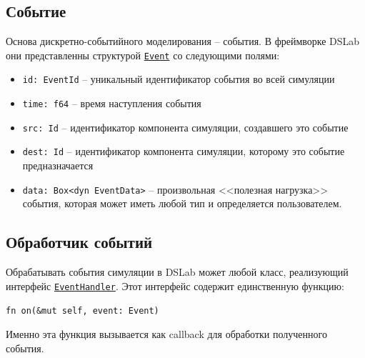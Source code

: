 \subsection{Событие} \label{Event}
Основа дискретно-событийного моделирования -- события. В фреймворке DSLab они представленны структурой \underline{\texttt{Event}} со следующими полями: 
\begin{itemize}
    \item \texttt{id: EventId} -- уникальный идентификатор события во всей симуляции
    \item \texttt{time: f64} -- время наступления события 
    \item \texttt{src: Id} -- идентификатор компонента симуляции, создавшего это событие 
    \item \texttt{dest: Id} -- идентификатор компонента симуляции, которому это событие предназначается
    \item \label{Event:payload} \texttt{data: Box<dyn EventData>} -- произвольная <<полезная нагрузка>> события, которая может иметь любой тип и определяется пользователем. 
\end{itemize}

\subsection{Обработчик событий} \label{EventHandler}

Обрабатывать события симуляции в DSLab может любой класс, реализующий интерфейс \underline{\texttt{EventHandler}}. Этот интерфейс содержит единственную функцию: 
\begin{center}
\texttt{fn on(\&mut self, event: Event)}
\label{fnon}
\end{center}

Именно эта функция вызывается как callback для обработки полученного события.

